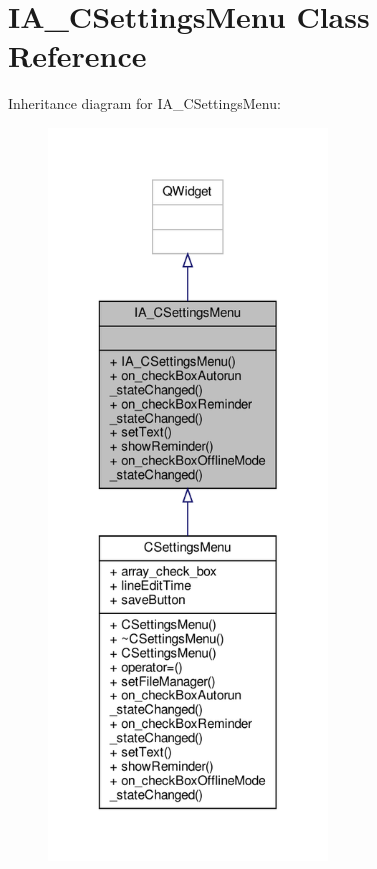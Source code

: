 \hypertarget{classIA__CSettingsMenu}{}\section{I\+A\+\_\+\+C\+Settings\+Menu Class Reference}
\label{classIA__CSettingsMenu}


Inheritance diagram for I\+A\+\_\+\+C\+Settings\+Menu\+:
\nopagebreak
\begin{figure}[H]
\begin{center}
\leavevmode
\includegraphics[height=550pt]{classIA__CSettingsMenu__inherit__graph}
\end{center}
\end{figure}


